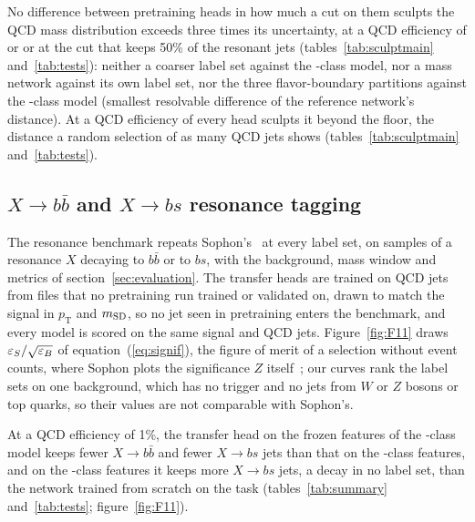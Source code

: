 No difference between pretraining heads in how much a cut on them sculpts the QCD mass distribution exceeds
three times its uncertainty, at a QCD efficiency of \SculptEffHigh{} or \SculptEffLow{} or at the cut that keeps
50\% of the resonant jets (tables~\ref{tab:sculptmain} and~\ref{tab:tests}): neither a coarser label set against the \Kfull-class
model, nor a mass network against its own label set, nor the three flavor-boundary partitions against the
\Kfull-class model (smallest resolvable difference \MlstPwSculpt{} of the reference network's distance). At a QCD
efficiency of \SculptEffHigh{} every head sculpts it beyond the floor, the distance a random selection of as many QCD
jets shows (tables~\ref{tab:sculptmain} and~\ref{tab:tests}).

\subsection{$X\to b\bar b$ and $X\to bs$ resonance tagging}\label{sec:xbx}

The resonance benchmark repeats Sophon's~\cite[Sec.~III]{sophon} at every label set, on samples of %
a resonance $X$ decaying to $b\bar b$ or to $bs$, with the background, mass window and metrics of
section~\ref{sec:evaluation}. The transfer heads are trained on QCD jets from files that no pretraining run
trained or validated on, drawn to match the signal in $p_{\mathrm{T}}$ and $m_{\mathrm{SD}}$, so no jet seen in pretraining
enters the benchmark, and every model is scored on the same signal and QCD jets. Figure~\ref{fig:F11} draws
$\varepsilon_S/\sqrt{\varepsilon_B}$ of equation~(\ref{eq:signif}), the figure of merit of a selection without event counts, where
Sophon plots the significance $Z$ itself~\cite[Fig.~2]{sophon}; our curves rank the label sets on one background,
which has no trigger and no jets from $W$ or $Z$ bosons or top quarks, so their values are not comparable with
Sophon's.

At a QCD efficiency of 1\%, the transfer head on the frozen features of the \Kcoarse-class model keeps fewer %
$X\to b\bar b$ and fewer $X\to bs$ jets than that on the \Kfull-class features, and on the \Kfull-class features %
it keeps more $X\to bs$ jets, a decay in no label set, than the network trained from scratch on the
task (tables~\ref{tab:summary} and~\ref{tab:tests}; figure~\ref{fig:F11}).

